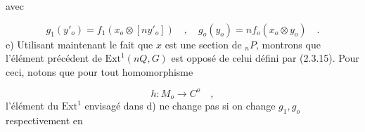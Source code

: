 \begin{center}
\end{center}
avec

\begin{equation*}
g_1(y'_o) = f_1(x_o \otimes [ny'_o]) \quad , \quad g_o(y_o) = nf_o(x_o \otimes y_o) \quad .
\end{equation*}
e) \quad Utilisant maintenant le fait que $x$ est une section de ${}_nP$, montrons que l'élément précédent de $\mathrm{Ext}^1(nQ,G)$ est opposé de celui défini par (2.3.15). Pour ceci, notons que pour tout homomorphisme

\begin{equation*}
h : M_o \longrightarrow C^o \quad ,
\end{equation*}
l'élément du $\mathrm{Ext}^1$ envisagé dans d) ne change pas si on change $g_1,g_o$ respectivement en

